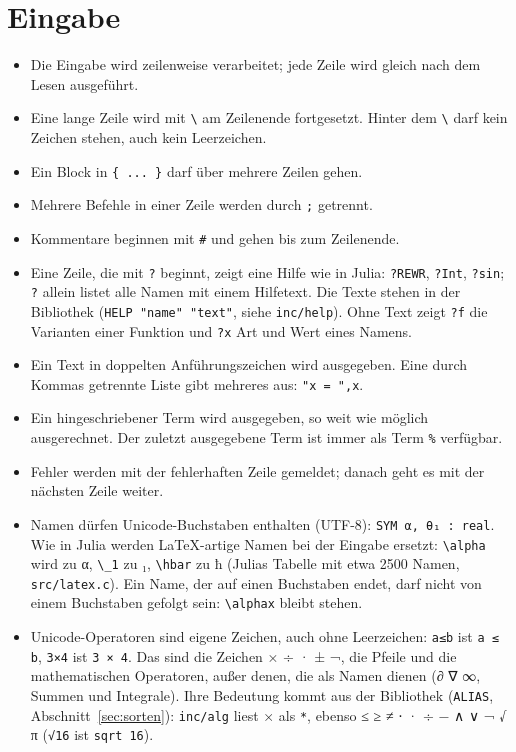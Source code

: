 \documentclass[a4paper,11pt]{article}
\newcommand{\kw}[1]{\texttt{#1}}
\begin{document}
\section{Eingabe}
\begin{itemize}
\item Die Eingabe wird zeilenweise verarbeitet; jede Zeile wird gleich
  nach dem Lesen ausgeführt.
\item Eine lange Zeile wird mit \verb|\| am Zeilenende fortgesetzt. Hinter
  dem \verb|\| darf kein Zeichen stehen, auch kein Leerzeichen.
\item Ein Block in \verb|{ ... }| darf über mehrere Zeilen gehen.
\item Mehrere Befehle in einer Zeile werden durch \kw{;} getrennt.
\item Kommentare beginnen mit \kw{\#} und gehen bis zum Zeilenende.
\item Eine Zeile, die mit \kw{?} beginnt, zeigt eine Hilfe wie in Julia:
  \kw{?REWR}, \kw{?Int}, \kw{?sin}; \kw{?} allein listet alle Namen mit
  einem Hilfetext. Die Texte stehen in der Bibliothek
  (\kw{HELP "name" "text"}, siehe \kw{inc/help}). Ohne Text zeigt
  \kw{?f} die Varianten einer Funktion und \kw{?x} Art und Wert eines
  Namens.
\item Ein Text in doppelten Anführungszeichen wird ausgegeben. Eine durch
  Kommas getrennte Liste gibt mehreres aus: \verb|"x = ",x|.
\item Ein hingeschriebener Term wird ausgegeben, so weit wie möglich
  ausgerechnet. Der zuletzt ausgegebene Term ist immer als Term \kw{\%}
  verfügbar.
\item Fehler werden mit der fehlerhaften Zeile gemeldet; danach geht es
  mit der nächsten Zeile weiter.
\item Namen dürfen Unicode-Buchstaben enthalten (UTF-8):
  \kw{SYM α, θ₁ : real}. Wie in Julia werden LaTeX-artige Namen bei der
  Eingabe ersetzt: \verb|\alpha| wird zu α, \verb|\_1| zu ₁, \verb|\hbar|
  zu ħ (Julias Tabelle mit etwa 2500 Namen, \kw{src/latex.c}). Ein Name,
  der auf einen Buchstaben endet, darf nicht von einem Buchstaben gefolgt
  sein: \verb|\alphax| bleibt stehen.
\item Unicode-Operatoren sind eigene Zeichen, auch ohne Leerzeichen:
  \kw{a≤b} ist \kw{a ≤ b}, \kw{3×4} ist \kw{3 × 4}. Das sind die Zeichen
  × ÷ · ± ¬, die Pfeile und die mathematischen Operatoren, außer denen,
  die als Namen dienen (∂ ∇ ∞, Summen und Integrale). Ihre Bedeutung
  kommt aus der Bibliothek (\kw{ALIAS}, Abschnitt~\ref{sec:sorten}):
  \kw{inc/alg} liest × als \kw{*}, ebenso ≤ ≥ ≠ ⋅ · ÷ − ∧ ∨ ¬ √ π
  (\kw{√16} ist \kw{sqrt 16}).
\end{itemize}
\end{document}
